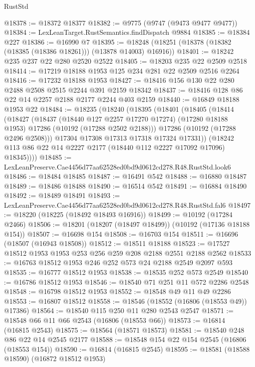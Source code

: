 \begin{lexlean}{RustStd}
\begin{coremodule}
@18378 := @18372 @18377
@18382 := @9775 (@9747 (@9473 @9477 @9477))
@18384 := LexLeanTarget.RustSemantics.findDispatch @9884
@18385 := @18384 @227
@18386 := @16990 @7
@18395 := @18248 (@18251 (@18378 (@18382 (@18385 (@18386 @18261))) (@13878 @14003) @16916))
@18401 := @18242 @235 @237 @22 @280 @2520 @2522
@18405 := @18203 @235 @22 @2509 @2518
@18414 := @17219 @18188 @1953 @125 @234 @281 @22 @2509 @2516 @2264
@18416 := @17232 @18188 @1953
@18427 := @18416 @156 @130 @22 @280 @2488 @2508 @2515 @2244 @391 @2159 @18342
@18437 := @18416 @128 @86 @22 @14 @2257 @2188 @2177 @2244 @403 @2159
@18440 := @16849 @18188 @1953 @22
@18484 := @18235
    (@18240
      (@18395
        (@18401
          (@18405
            (@18414
              (@18427
                (@18437
                  (@18440 @127 @2257 @17270 @17274)
                  (@17280 @18188 @1953)
                  @17286
                  (@10192 (@17288 @2502 @2188)))
                @17286
                (@10192 (@17288 @2496 @2508)))
              @17304
              @17308
              @17313
              @17318
              @17324
              @17331))
          (@18242 @113 @86 @22 @14 @2227 @2177 (@18440 @112 @2227 @17092 @17096) @18345))))
@18485 := LexLeanPreserve.Cae4456d77aa62528ed0bd9d0612cd278.R48.RustStd.look6
@18486 := @18484 @18485
@18487 := @16491 @542
@18488 := @16880 @18487
@18489 := @18486 @18488
@18490 := @16514 @542
@18491 := @16884 @18490
@18492 := @18489 @18491
@18493 := LexLeanPreserve.Cae4456d77aa62528ed0bd9d0612cd278.R48.RustStd.fal6
@18497 := @18220 (@18225 (@18492 @18493 @16916))
@18499 := @10192 (@17284 @2466)
@18506 := @18201 (@18207 (@18497 @18499)) (@10192 (@17136 @18188 @154))
@18507 := @16698 @154
@18508 := @16703 @154
@18511 := @16696 (@18507 (@16943 @18508))
@18512 := @18511 @18188
@18523 := @17527 @18512 @1953 @1953 @253 @256 @259 @208 @2188 @2551 @2188 @2562
@18533 := @16763 @18512 @1953 @246 @252 @573 @24 @2188 @2549 @2097 @593
@18535 := @16777 @18512 @1953
@18538 := @18535 @252 @573 @2549
@18540 := @16786 @18512 @1953
@18546 := @18540 @71 @251 @11 @572 @2286 @2548
@18548 := @16798 @18512 @1953
@18552 := @18548 @49 @11 @49 @2286
@18553 := @16807 @18512
@18558 := @18546 (@18552 (@16806 (@18553 @49)) @17386)
@18564 := @18540 @115 @250 @11 @280 @2543 @2547
@18571 := @18548 @66 @11 @66 @2543 (@16806 (@18553 @66))
@18573 := @16814 (@16815 @2543)
@18575 := @18564 (@18571 @18573)
@18581 := @18540 @248 @86 @22 @14 @2545 @2177
@18588 := @18548 @154 @22 @154 @2545 (@16806 (@18553 @154))
@18590 := @16814 (@16815 @2545)
@18595 := @18581 (@18588 @18590) (@16872 @18512 @1953)

\end{coremodule}
\end{lexlean}
